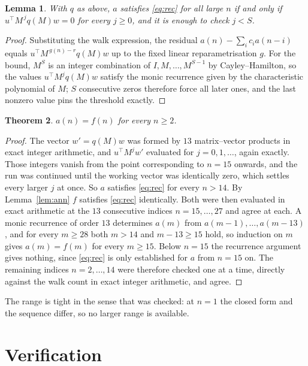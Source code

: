\documentclass[11pt,a4paper]{article}
\theoremstyle{plain}
\newtheorem{theorem}{Theorem}
\newtheorem{lemma}[theorem]{Lemma}
\theoremstyle{definition}
\begin{document}
\begin{lemma}\label{lem:crit}
With $q$ as above, $a$ satisfies \eqref{eq:rec} for all large $n$ if and only if
$u^{\!\top}M^{\,j}q(M)w=0$ for every $j\ge0$, and it is enough to check $j<S$.
\end{lemma}

\begin{proof}
Substituting the walk expression, the residual $a(n)-\sum_ic_ia(n-i)$ equals
$u^{\!\top}M^{\,g(n)-r}q(M)w$ up to the fixed linear reparametrisation $g$. For the bound,
$M^{S}$ is an integer combination of $I,M,\dots,M^{S-1}$ by Cayley--Hamilton, so the values
$u^{\!\top}M^{j}q(M)w$ satisfy the monic recurrence given by the characteristic polynomial of
$M$; $S$ consecutive zeros therefore force all later ones, and the last nonzero value pins the
threshold exactly.
\end{proof}

\begin{theorem}
$a(n)=f(n)$ for every $n\ge2$.
\end{theorem}

\begin{proof}
The vector $w'=q(M)w$ was formed by $13$ matrix--vector products in exact integer
arithmetic, and $u^{\!\top}M^{j}w'$ evaluated for $j=0,1,\dots$, again exactly. Those integers
vanish from the point corresponding to $n=15$ onwards, and the run was continued until the
working vector was identically zero, which settles every larger $j$ at once. So $a$ satisfies
\eqref{eq:rec} for every $n>14$. By Lemma~\ref{lem:ann} $f$ satisfies \eqref{eq:rec}
identically. Both were then evaluated in exact arithmetic at the $13$ consecutive indices
$n=15,\dots,27$ and agree at each. A monic recurrence of order $13$
determines $a(m)$ from $a(m-1),\dots,a(m-13)$, and for every $m\ge28$ both
$m>14$ and $m-13\ge15$ hold, so induction on $m$ gives $a(m)=f(m)$ for every
$m\ge15$.
Below $n=15$ the recurrence argument gives nothing, since \eqref{eq:rec} is only
established for $a$ from $n=15$ on. The remaining indices $n=2,\dots,14$ were
therefore checked one at a time, directly against the walk count in exact integer arithmetic,
and agree.
\end{proof}

The range is tight in the sense that was checked: at $n=1$ the closed form and the sequence differ, so no larger range is available.

\section{Verification}
\end{document}
